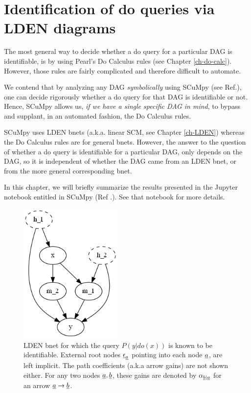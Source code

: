 \chapter{Identification of do queries via LDEN
diagrams}
\label{ch-iden-LDEN}

The most general way to decide whether a do query for
a particular DAG is identifiable, is by using Pearl's
Do Calculus rules (see Chapter \ref{ch-do-calc}). However, those rules are fairly 
complicated and therefore difficult to automate.


We contend that by analyzing any DAG {\it symbolically} using 
SCuMpy (see Ref.\cite{scumpy}), one can decide rigorously 
whether a
do query for that DAG is identifiable or not. Hence, SCuMpy
allows us, {\it if we have a single specific DAG in mind}, to bypass and supplant, in an automated 
fashion, the Do Calculus rules.

SCuMpy uses
LDEN bnets (a.k.a. linear SCM, see Chapter \ref{ch-LDEN}) whereas
the Do Calculus rules are for general bnets.
However, the answer to the question
of whether a do query is identifiable
for a particular DAG,
only depends on the DAG,
so it is independent of whether
the DAG came from an LDEN bnet, or from
the more general corresponding bnet.


In this chapter,
we will briefly summarize the results
presented in the
Jupyter notebook entitled  in SCuMpy (Ref
.\cite{scumpy}). See that notebook
for more details.

\begin{figure}[h!]
\centering
\includegraphics[width=2in]
{iden-LDEN/uncon-children.png}
\caption{LDEN bnet for which
the query $P(y|do(x))$
is  known to be identifiable.
External root nodes $\rveps_\rva$ 
pointing into each node $\rva$,
are left implicit.
The path coefficients (a.k.a
arrow gains)
are not shown either. 
For any two nodes $\rva, \rvb$,
these gains
 are denoted
   by $\alp_{\rvb|\rva}$
for an arrow $\rva\rarrow \rvb$.}
\label{fig-uncon-children}
\end{figure}

